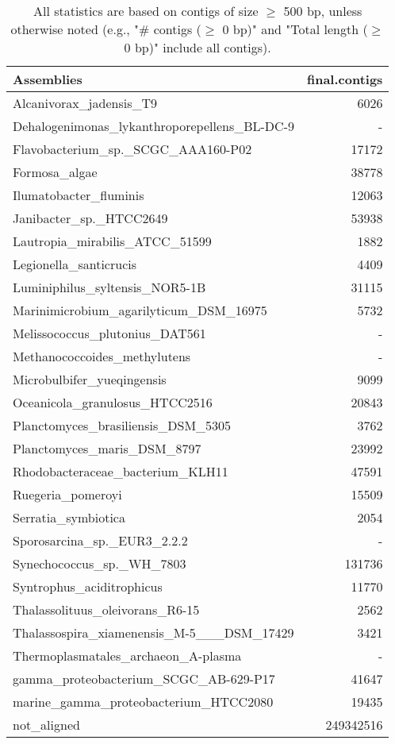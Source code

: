 \documentclass[12pt,a4paper]{article}
\begin{document}
\begin{table}[ht]
\begin{center}
\caption{All statistics are based on contigs of size $\geq$ 500 bp, unless otherwise noted (e.g., "\# contigs ($\geq$ 0 bp)" and "Total length ($\geq$ 0 bp)" include all contigs).}
\begin{tabular}{|l*{1}{|r}|}
\hline
Assemblies & final.contigs \\ \hline
Alcanivorax\_jadensis\_T9 & 6026 \\ \hline
Dehalogenimonas\_lykanthroporepellens\_BL-DC-9 & - \\ \hline
Flavobacterium\_sp.\_SCGC\_AAA160-P02 & 17172 \\ \hline
Formosa\_algae & 38778 \\ \hline
Ilumatobacter\_fluminis & 12063 \\ \hline
Janibacter\_sp.\_HTCC2649 & 53938 \\ \hline
Lautropia\_mirabilis\_ATCC\_51599 & 1882 \\ \hline
Legionella\_santicrucis & 4409 \\ \hline
Luminiphilus\_syltensis\_NOR5-1B & 31115 \\ \hline
Marinimicrobium\_agarilyticum\_DSM\_16975 & 5732 \\ \hline
Melissococcus\_plutonius\_DAT561 & - \\ \hline
Methanococcoides\_methylutens & - \\ \hline
Microbulbifer\_yueqingensis & 9099 \\ \hline
Oceanicola\_granulosus\_HTCC2516 & 20843 \\ \hline
Planctomyces\_brasiliensis\_DSM\_5305 & 3762 \\ \hline
Planctomyces\_maris\_DSM\_8797 & 23992 \\ \hline
Rhodobacteraceae\_bacterium\_KLH11 & 47591 \\ \hline
Ruegeria\_pomeroyi & 15509 \\ \hline
Serratia\_symbiotica & 2054 \\ \hline
Sporosarcina\_sp.\_EUR3\_2.2.2 & - \\ \hline
Synechococcus\_sp.\_WH\_7803 & 131736 \\ \hline
Syntrophus\_aciditrophicus & 11770 \\ \hline
Thalassolituus\_oleivorans\_R6-15 & 2562 \\ \hline
Thalassospira\_xiamenensis\_M-5\_\_\_DSM\_17429 & 3421 \\ \hline
Thermoplasmatales\_archaeon\_A-plasma & - \\ \hline
gamma\_proteobacterium\_SCGC\_AB-629-P17 & 41647 \\ \hline
marine\_gamma\_proteobacterium\_HTCC2080 & 19435 \\ \hline
not\_aligned & 249342516 \\ \hline
\end{tabular}
\end{center}
\end{table}
\end{document}
